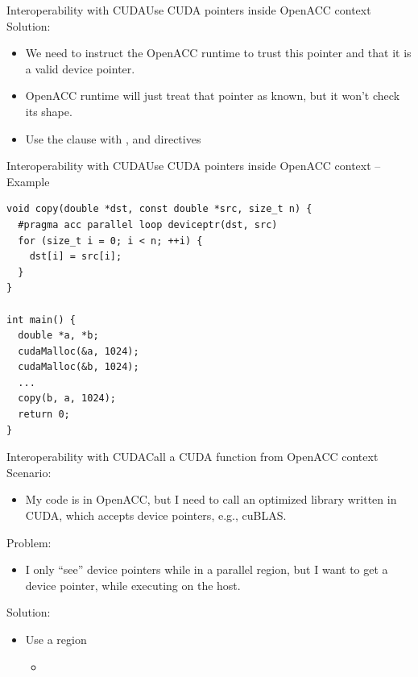 \documentclass[12pt,aspectratio=169]{beamer}
\begin{document}
\begin{frame}{Interoperability with CUDA}{Use CUDA pointers inside OpenACC context}
  Solution:
  \vspace\baselineskip
  \begin{itemize}
  \item We need to instruct the OpenACC runtime to trust this pointer and that it is a valid device pointer.
  \item OpenACC runtime will just treat that pointer as known, but it won't check its shape.
  \item Use the  clause with
    ,  and  directives
  \end{itemize}
\end{frame}

\begin{frame}[fragile]{Interoperability with CUDA}{Use CUDA pointers inside OpenACC context -- Example}
  \begin{lstlisting}[style=CppStyle]
void copy(double *dst, const double *src, size_t n) {
  #pragma acc parallel loop deviceptr(dst, src)
  for (size_t i = 0; i < n; ++i) {
    dst[i] = src[i];
  }
}

int main() {
  double *a, *b;
  cudaMalloc(&a, 1024);
  cudaMalloc(&b, 1024);
  ...
  copy(b, a, 1024);
  return 0;
}
  \end{lstlisting}
\end{frame}

\begin{frame}[fragile]{Interoperability with CUDA}{Call a CUDA function from OpenACC context}
  Scenario:
  \begin{itemize}
  \item My code is in OpenACC, but I need to call an optimized library written in CUDA, which accepts device pointers, e.g., cuBLAS.
  \end{itemize}
  \pause
  Problem:
  \begin{itemize}
  \item I only ``see'' device pointers while in a parallel region, but I want to get a device pointer, while executing on the host.
  \end{itemize}
  \pause
  Solution:
  \begin{itemize}
  \item Use a  region
    \begin{itemize}
    \item {}
    \end{itemize}
  \end{itemize}
\end{frame}
\end{document}
